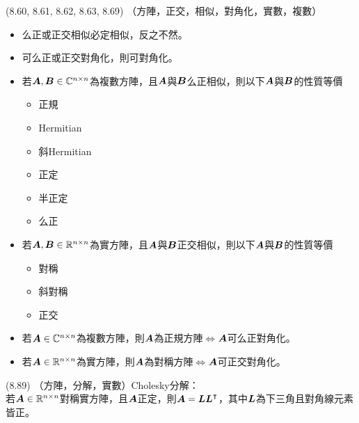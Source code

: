 \item \begin{theorem}{(8.60, 8.61, 8.62, 8.63, 8.69)} （方陣，正交，相似，對角化，實數，複數）
	\begin{itemize}
		\item 么正或正交相似必定相似，反之不然。
		\item 可么正或正交對角化，則可對角化。
		\item 若$\boldsymbol{A}, \boldsymbol{B} \in \mathbb{C}^{n \times n}$為複數方陣，且$\boldsymbol{A}$與$\boldsymbol{B}$么正相似，則以下$\boldsymbol{A}$與$\boldsymbol{B}$的性質等價
			\begin{itemize}
				\item 正規
				\item Hermitian
				\item 斜Hermitian
				\item 正定
				\item 半正定
				\item 么正
			\end{itemize}
		\item 若$\boldsymbol{A}, \boldsymbol{B} \in \mathbb{R}^{n \times n}$為實方陣，且$\boldsymbol{A}$與$\boldsymbol{B}$正交相似，則以下$\boldsymbol{A}$與$\boldsymbol{B}$的性質等價
		\begin{itemize}
			\item 對稱
			\item 斜對稱
			\item 正交
		\end{itemize}
		\item 若$\boldsymbol{A} \in \mathbb{C}^{n \times n}$為複數方陣，則$\boldsymbol{A}$為正規方陣$\iff$$\boldsymbol{A}$可么正對角化。
		\item 若$\boldsymbol{A} \in \mathbb{R}^{n \times n}$為實方陣，則$\boldsymbol{A}$為對稱方陣$\iff$$\boldsymbol{A}$可正交對角化。
	\end{itemize}
\end{theorem}

\item \begin{theorem}{(8.89)} （方陣，分解，實數）Cholesky分解： \\
	若$\boldsymbol{A} \in \mathbb{R}^{n \times n}$對稱實方陣，且$\boldsymbol{A}$正定，則$\boldsymbol{A} = \boldsymbol{LL}^\intercal$，其中$\boldsymbol{L}$為下三角且對角線元素皆正。
\end{theorem}

